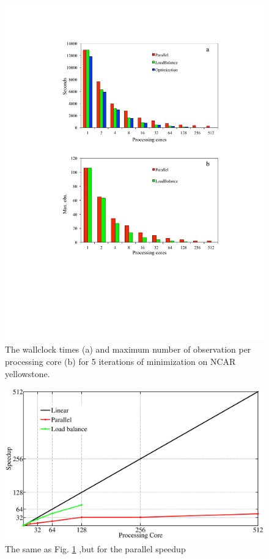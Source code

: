 \documentclass[12pt]{article}
\begin{document}
\begin{figure}
\noindent\includegraphics[width=40pc, trim=30 200 100 50, clip]{figures/Walltime.pdf}
\caption{The wallclock times (a) and maximum number of observation per processing core (b) for 5 iterations of minimization on NCAR yellowstone.}
\label{timing}
\end{figure}
%
\begin{figure}
\noindent\includegraphics[width=40pc,trim=30 20 150 50, clip,]{figures/speedup.eps}
\caption{The same as Fig. \ref{timing} ,but for the parallel speedup}
\label{spd}
\end{figure}
\end{document}
